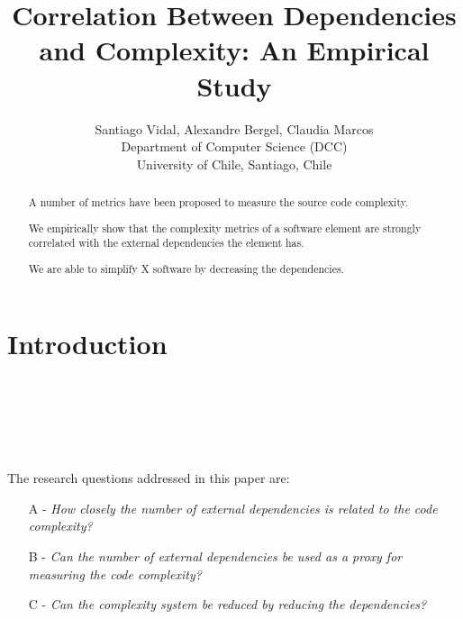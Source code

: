 \documentclass{sig-alternate}
\newcommand{\Title}{Correlation Between Dependencies and Complexity: An Empirical Study}
\newcommand{\TitleShort}{\Title}
\newcommand{\Authors}{Santiago Vidal, Alexandre Bergel, Claudia Marcos}
\newcommand{\AuthorsShort}{S. Vidal, A. Bergel, C. Marcos}
\newcommand{\seclabel}[1]{\label{sec:#1}}
\begin{document}
\title{\Title}

\author{\Authors\\[3mm]
Department of Computer Science (DCC)\\ University of Chile, Santiago, Chile\\[1 ex]
} 

\maketitle


\begin{abstract}
A number of metrics have been proposed to measure the source code complexity. 


We empirically show that the complexity metrics of a software element are strongly correlated with the external dependencies the element has.

We are able to simplify X software by decreasing the dependencies.

\end{abstract}

\section{Introduction}\seclabel{introduction}

~\cite{Sang05a}

~\cite{Baxt06a}

~\cite{Taub11a}


The research questions addressed in this paper are:
\begin{itemize}
\item[A -] \emph{How closely the number of external dependencies is related to the code complexity?}
\item[B -] \emph{Can the number of external dependencies be used as a proxy for measuring the code complexity?}
\item[C -] \emph{Can the complexity system be reduced by reducing the dependencies?}
\end{itemize}
\end{document}
